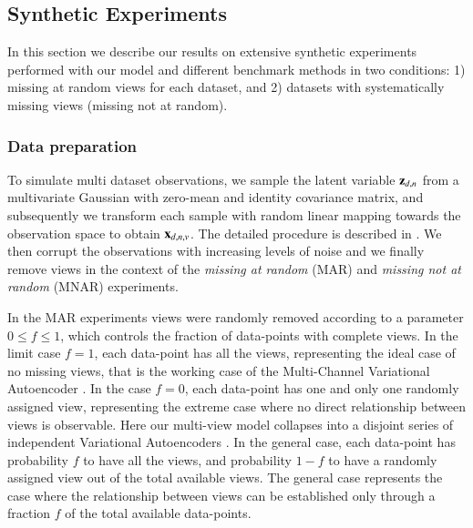 \subsection{Synthetic Experiments}
\label{sec:synth}

In this section we describe our results on extensive synthetic experiments performed with our model and different benchmark methods in two conditions:
1) missing at random views for each dataset,
and 2) datasets with systematically missing views (missing not at random).

\subsubsection{Data preparation}

To simulate multi dataset observations, we sample the latent variable $\mathbf{z}_{d,n}$ from a multivariate Gaussian with zero-mean and identity covariance matrix, and subsequently we transform each sample with random linear mapping towards the observation space to obtain $\mathbf{x}_{d,n,v}$.
The detailed procedure is described in \asupmat.
We then corrupt the observations with increasing levels of noise
and we finally remove views in the context of the \textit{missing at random} (MAR) and \textit{missing not at random} (MNAR) experiments.

In the MAR experiments views were randomly removed according to a parameter $0 \leq f \leq 1$, which controls the fraction of data-points with complete views.
In the limit case $f=1$, each data-point has all the views, representing the ideal case of no missing views, that is the working case of the Multi-Channel Variational Autoencoder \citep{Antelmi2019}.
In the case $f=0$, each data-point has one and only one randomly assigned view, representing the extreme case where no direct relationship between views is observable.
Here our multi-view model collapses into a disjoint series of independent Variational Autoencoders \citep{Kingma2013, Rezende2014}.
In the general case, each data-point has probability $f$ to have all the views, and probability $1-f$ to have a randomly assigned view out of the total available views.
The general case represents the case where the relationship between views can be established only through a fraction $f$ of the total available data-points.

